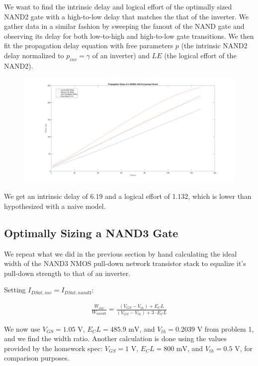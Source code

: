 \documentclass[11pt]{article}
\begin{document}
We want to find the intrinsic delay and logical effort of the optimally sized NAND2 gate with a high-to-low delay that matches the that of the inverter. We gather data in a similar fashion by sweeping the fanout of the NAND gate and observing its delay for both low-to-high and high-to-low gate transitions. We then fit the propagation delay equation with free parameters $p$ (the intrinsic NAND2 delay normalized to $p_{inv} = \gamma$ of an inverter) and $LE$ (the logical effort of the NAND2).

\begin{figure}[H]
	\centerline{\includegraphics[width=\textwidth+2cm]{images/nand2_delay_vs_fanout.png}}
\end{figure}

We get an intrinsic delay of 6.19 and a logical effort of 1.132, which is lower than hypothesized with a naive model.

\subsection{Optimally Sizing a NAND3 Gate}
We repeat what we did in the previous section by hand calculating the ideal width of the NAND3 NMOS pull-down network transistor stack to equalize it's pull-down strength to that of an inverter.

Setting $I_{DSat,inv} = I_{DSat,nand3}$:

\begin{eqnarray}
\frac{W_{inv}}{W_{nand3}} = \frac{(V_{GS} - V_{th}) + E_C L}{(V_{GS} - V_{th}) + 3 \cdot E_C L} \nonumber
\end{eqnarray}

We now use $V_{GS} = 1.05 \text{ V}$, $E_C L = 485.9 \text{ mV}$, and $V_{th} = 0.2039 \text{ V}$ from problem 1, and we find the width ratio. Another calculation is done using the values provided by the homework spec: $V_{GS} = 1 \text{ V}$, $E_C L = 800 \text{ mV}$, and $V_{th} = 0.5 \text{ V}$, for comparison purposes.
\end{document}

